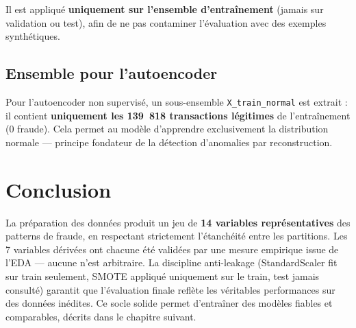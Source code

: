 Il est appliqué \textbf{uniquement sur l'ensemble d'entraînement} (jamais sur validation
ou test), afin de ne pas contaminer l'évaluation avec des exemples synthétiques.

\subsection{Ensemble pour l'autoencoder}

Pour l'autoencoder non supervisé, un sous-ensemble \texttt{X\_train\_normal} est extrait :
il contient \textbf{uniquement les 139~818 transactions légitimes} de l'entraînement
(0 fraude). Cela permet au modèle d'apprendre exclusivement la distribution normale ---
principe fondateur de la détection d'anomalies par reconstruction.

\section*{Conclusion}

La préparation des données produit un jeu de \textbf{14 variables représentatives} des
patterns de fraude, en respectant strictement l'étanchéité entre les partitions. Les
7 variables dérivées ont chacune été validées par une mesure empirique issue de l'EDA ---
aucune n'est arbitraire. La discipline anti-leakage (StandardScaler fit sur train seulement,
SMOTE appliqué uniquement sur le train, test jamais consulté) garantit que l'évaluation
finale reflète les véritables performances sur des données inédites. Ce socle solide permet
d'entraîner des modèles fiables et comparables, décrits dans le chapitre suivant.
